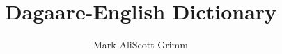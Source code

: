 \title{Dagaare-English Dictionary}
\author{Mark Ali\lastand Scott Grimm}%

\renewcommand{\lsISBNdigital}{000-0-000000-00-0}
\renewcommand{\lsISBNsoftcover}{000-0-000000-00-0}
\renewcommand{\lsISBNsoftcoverus}{000-0-000000-00-0}
\renewcommand{\lsSeries}{algad} %
\renewcommand{\lsSeriesNumber}{99} %
\renewcommand{\lsID}{000} %
